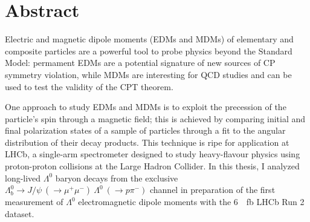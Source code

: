 \documentclass[12pt,a4paper]{book}
\renewcommand{\chaptermark}[1]{\markboth{#1}{}}
\newcommand{\demonstratorfull}{$\Lambda_b^0 \rightarrow J/\psi~(\rightarrow \mu^+ \mu^-)~\Lambda^0~(\rightarrow p\pi^-)$\xspace}
\newcommand{\lz}{$\Lambda^0$\xspace}
\begin{document}





\mainmatter

\chapter*{Abstract}

Electric and magnetic dipole moments (EDMs and MDMs) of elementary and composite particles are a powerful tool to probe physics beyond the Standard Model:
permament EDMs are a potential signature of new sources of CP symmetry violation, while MDMs are interesting for QCD studies and can be used to test the validity of the CPT theorem.

One approach to study EDMs and MDMs is to exploit the precession of the particle's spin %
through a magnetic field;
this is achieved by comparing initial and final polarization states of a sample of particles through a fit to the angular distribution of their decay products.
This technique is ripe for application at LHCb, a single-arm spectrometer designed to study heavy-flavour physics using proton-proton collisions at the Large Hadron Collider.
In this thesis, I analyzed long-lived \lz baryon decays from the exclusive \demonstratorfull channel in preparation of the first measurement of \lz electromagnetic dipole moments with the \SI{6}{\per\femto\barn} LHCb Run 2 dataset.
\end{document}
